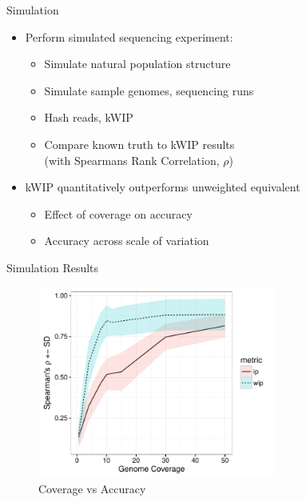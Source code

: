 \documentclass[t]{beamer}
\begin{document}
\begin{frame}{Simulation}
  \begin{itemize}
    \item Perform simulated sequencing experiment:
    \begin{itemize}
      \item Simulate natural population structure
      \item Simulate sample genomes, sequencing runs
      \item Hash reads, kWIP
      \item Compare known truth to kWIP results \\ \tiny{(with Spearmans Rank
        Correlation, $\rho$)}
    \end{itemize}
    \item kWIP quantitatively outperforms unweighted equivalent
      \begin{itemize}
        \item Effect of coverage on accuracy
        \item Accuracy across scale of variation
      \end{itemize}
  \end{itemize}
\end{frame}

\begin{frame}{Simulation Results}
  \begin{figure}
    \centering
    \caption{Coverage vs Accuracy}
    \includegraphics[width=0.7\textwidth]{img/coverage-vs-rho_50x.pdf}
  \end{figure}
\end{frame}
\end{document}
